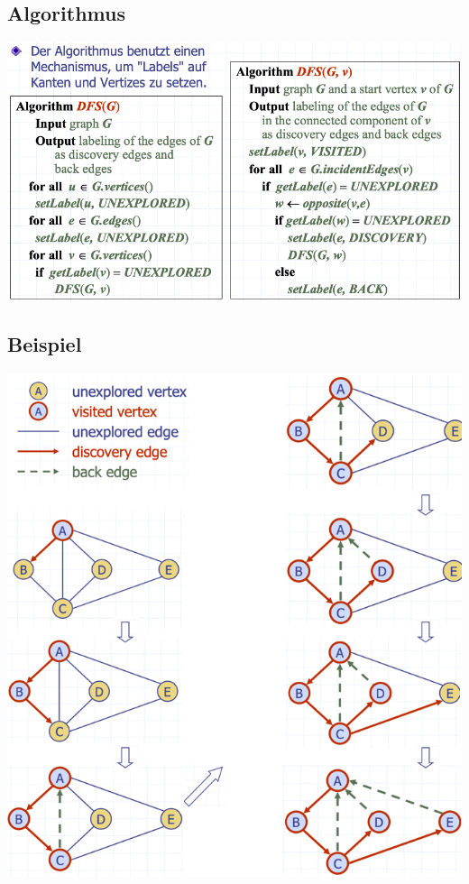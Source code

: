 \subsection{Algorithmus}
\begin{center}
    \includegraphics[scale=.4]{graphic/12 DFS/Algorithmus.png}
\end{center}
\vspace{-8pt}


\subsection{Beispiel}
\begin{center}
    \includegraphics[scale=.4]{graphic/12 DFS/Beispiel.png}
\end{center}
\vspace{-8pt}


